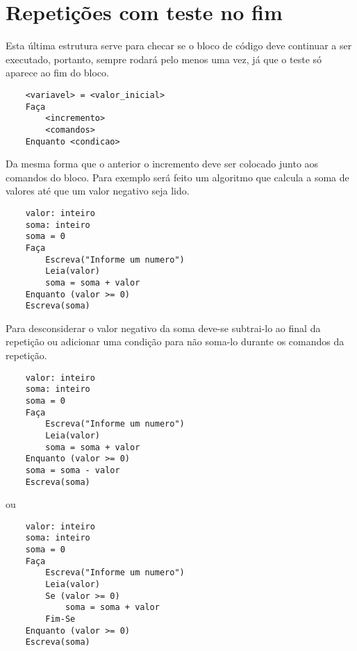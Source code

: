 \section{Repetições com teste no fim}
Esta última estrutura serve para checar se o bloco de código deve continuar a ser executado, portanto, sempre rodará pelo menos uma vez, já que o teste só aparece ao fim do bloco.
\begin{lstlisting}
    <variavel> = <valor_inicial>
    Faça
        <incremento>
        <comandos>
    Enquanto <condicao>
\end{lstlisting}
Da mesma forma que o anterior o incremento deve ser colocado junto aos comandos do bloco. Para exemplo será feito um algoritmo que calcula a soma de valores até que um valor negativo seja lido.
\begin{lstlisting}
    valor: inteiro
    soma: inteiro
    soma = 0
    Faça
        Escreva("Informe um numero")
        Leia(valor)
        soma = soma + valor
    Enquanto (valor >= 0)
    Escreva(soma)
\end{lstlisting}
Para desconsiderar o valor negativo da soma deve-se subtrai-lo ao final da repetição ou adicionar uma condição para não soma-lo durante os comandos da repetição.
\begin{lstlisting}
    valor: inteiro
    soma: inteiro
    soma = 0
    Faça
        Escreva("Informe um numero")
        Leia(valor)
        soma = soma + valor
    Enquanto (valor >= 0)
    soma = soma - valor
    Escreva(soma)
\end{lstlisting}
ou
\begin{lstlisting}
    valor: inteiro
    soma: inteiro
    soma = 0
    Faça
        Escreva("Informe um numero")
        Leia(valor)
        Se (valor >= 0)
            soma = soma + valor
        Fim-Se
    Enquanto (valor >= 0)
    Escreva(soma)
\end{lstlisting}